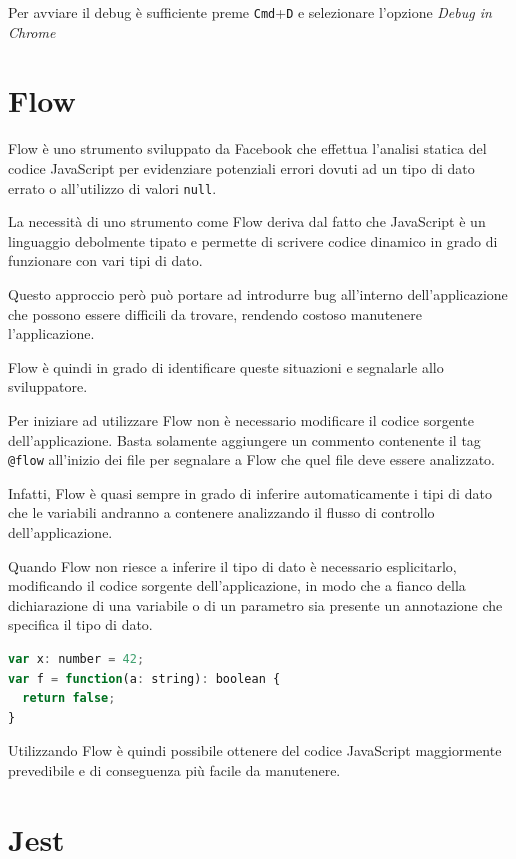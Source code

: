 Per avviare il debug è sufficiente preme \texttt{Cmd}+\texttt{D} e selezionare l'opzione \textit{Debug in Chrome}

\section{Flow}

Flow è uno strumento sviluppato da Facebook che effettua l'analisi statica del codice JavaScript per evidenziare potenziali errori dovuti ad un tipo di dato errato o all'utilizzo di valori \texttt{null}.

La necessità di uno strumento come Flow deriva dal fatto che JavaScript è un linguaggio debolmente tipato e permette di scrivere codice dinamico in grado di funzionare con vari tipi di dato.

Questo approccio però può portare ad introdurre bug all'interno dell'applicazione che possono essere difficili da trovare, rendendo costoso manutenere l'applicazione.

Flow è quindi in grado di identificare queste situazioni e segnalarle allo sviluppatore.

Per iniziare ad utilizzare Flow non è necessario modificare il codice sorgente dell'applicazione. Basta solamente aggiungere un commento contenente il tag \texttt{@flow} all'inizio dei file per segnalare a Flow che quel file deve essere analizzato.

Infatti, Flow è quasi sempre in grado di inferire automaticamente i tipi di dato che le variabili andranno a contenere analizzando il flusso di controllo dell'applicazione.

Quando Flow non riesce a inferire il tipo di dato è necessario esplicitarlo, modificando il codice sorgente dell'applicazione, in modo che a fianco della dichiarazione di una variabile o di un parametro sia presente un annotazione che specifica il tipo di dato.

\begin{lstlisting}[language=JavaScript, caption=Esempio della notazione di Flow]
var x: number = 42;
var f = function(a: string): boolean {
  return false;
}
\end{lstlisting}

Utilizzando Flow è quindi possibile ottenere del codice JavaScript maggiormente prevedibile e di conseguenza più facile da manutenere.

\section{Jest}

